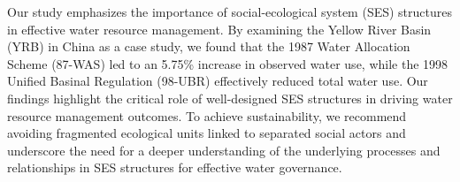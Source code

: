 Our study emphasizes the importance of social-ecological system (SES) structures in effective water resource management. By examining the Yellow River Basin (YRB) in China as a case study, we found that the 1987 Water Allocation Scheme (87-WAS) led to an 5.75\% increase in observed water use, while the 1998 Unified Basinal Regulation (98-UBR) effectively reduced total water use. Our findings highlight the critical role of well-designed SES structures in driving water resource management outcomes. To achieve sustainability, we recommend avoiding fragmented ecological units linked to separated social actors and underscore the need for a deeper understanding of the underlying processes and relationships in SES structures for effective water governance.
